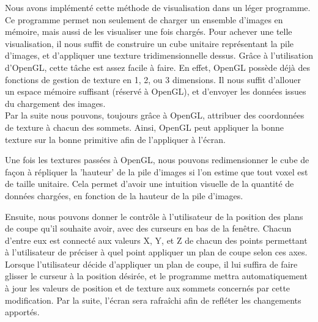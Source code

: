 {{		\par

		Nous avons implémenté cette méthode de visualisation dans un léger programme. Ce programme permet non seulement de charger un ensemble d'images en mémoire, mais aussi de les visualiser une fois chargés. Pour achever une telle visualisation, il nous suffit de construire un cube unitaire représentant la pile d'images, et d'appliquer une texture tridimensionnelle dessus. Grâce à l'utilisation d'OpenGL, cette tâche est assez facile à faire. En effet, OpenGL possède déjà des fonctions de gestion de texture en 1, 2, ou 3 dimensions. Il nous suffit d'allouer un espace mémoire suffisant (réservé à OpenGL), et d'envoyer les données issues du chargement des images.\\
		Par la suite nous pouvons, toujours grâce à OpenGL, attribuer des coordonnées de texture à chacun des sommets. Ainsi, OpenGL peut appliquer la bonne texture sur la bonne primitive afin de l'appliquer à l'écran.\par

		\par

		Une fois les textures passées à OpenGL, nous pouvons redimensionner le cube de façon à répliquer la 'hauteur' de la pile d'images si l'on estime que tout voxel est de taille unitaire. Cela permet d'avoir une intuition visuelle de la quantité de données chargées, en fonction de la hauteur de la pile d'images.

		\par

		Ensuite, nous pouvons donner le contrôle à l'utilisateur de la position des plans de coupe qu'il souhaite avoir, avec des curseurs en bas de la fenêtre. Chacun d'entre eux est connecté aux valeurs X, Y, et Z de chacun des points permettant à l'utilisateur de préciser à quel point appliquer un plan de coupe selon ces axes. Lorsque l'utilisateur décide d'appliquer un plan de coupe, il lui suffira de faire glisser le curseur à la position désirée, et le programme mettra automatiquement à jour les valeurs de position et de texture aux sommets concernés par cette modification. Par la suite, l'écran sera rafraîchi afin de refléter les changements apportés.\par

}}
